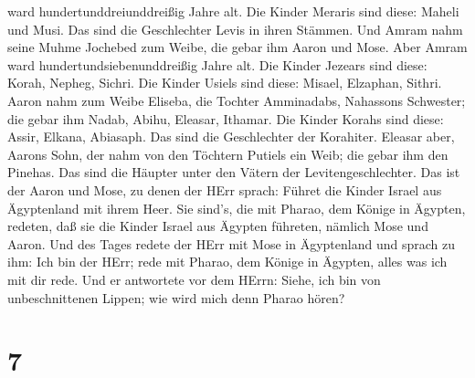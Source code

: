 ward hundertunddreiunddreißig Jahre alt.  Die Kinder
Meraris sind diese: Maheli und Musi. Das sind die Geschlechter Levis in
ihren Stämmen.  Und Amram nahm seine Muhme Jochebed zum
Weibe, die gebar ihm Aaron und Mose. Aber Amram ward
hundertundsiebenunddreißig Jahre alt.  Die Kinder Jezears
sind diese: Korah, Nepheg, Sichri.  Die Kinder Usiels sind
diese: Misael, Elzaphan, Sithri.  Aaron nahm zum Weibe
Eliseba, die Tochter Amminadabs, Nahassons Schwester; die gebar ihm
Nadab, Abihu, Eleasar, Ithamar.  Die Kinder Korahs sind
diese: Assir, Elkana, Abiasaph. Das sind die Geschlechter der Korahiter.
 Eleasar aber, Aarons Sohn, der nahm von den Töchtern
Putiels ein Weib; die gebar ihm den Pinehas. Das sind die Häupter unter
den Vätern der Levitengeschlechter.  Das ist der Aaron und
Mose, zu denen der HErr sprach: Führet die Kinder Israel aus Ägyptenland
mit ihrem Heer.  Sie sind's, die mit Pharao, dem Könige in
Ägypten, redeten, daß sie die Kinder Israel aus Ägypten führeten,
nämlich Mose und Aaron.  Und des Tages redete der HErr mit
Mose in Ägyptenland  und sprach zu ihm: Ich bin der HErr;
rede mit Pharao, dem Könige in Ägypten, alles was ich mit dir rede.
 Und er antwortete vor dem HErrn: Siehe, ich bin von
unbeschnittenen Lippen; wie wird mich denn Pharao hören?

\hypertarget{section-6}{%
\section{7}\label{section-6}}

